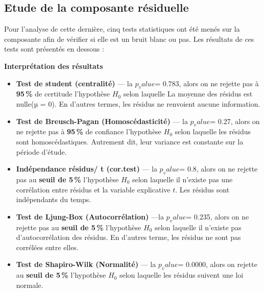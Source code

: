 \documentclass[
12pt,          %
a4paper,       %
oneside,       %
openright      %
]{report}
\begin{document}
 \subsection{Etude de la composante résiduelle}
 
 Pour l'analyse de cette dernière, cinq tests statistiques ont été menés sur la composante afin de vérifier si elle est un bruit blanc ou pas. 
 Les résultats de ces tests sont présentés en dessous : 
 
 \begin{table}[H]
 	\centering
 	
 	\caption{Résultats des tests statistiques sur la composante résiduelle}
 	\label{tab:resultats_tests_holt_winters}
 \end{table}
 
 \textbf{ Interprétation des résultats}
 

 
 \begin{itemize}
 	\item \textbf{Test de student (centralité)} --- la \textbf{$p_value$}= 0.783, alors on ne rejette pas  à \textbf{ 95\,\%} de certitude l'hypothèse $H_0$  selon laquelle La moyenne des résidus est nulle(µ = 0). En d'autres termes, les résidus ne renvoient aucune information.
 	
 	\item \textbf{Test de Breusch-Pagan (Homoscédasticité)} --- la \textbf{$p_value$}= 0.27, alors on ne rejette pas à \textbf{ 95\,\%} de confiance l'hypothèse $H_0$ selon laquelle les résidus sont homoscédastiques. Autrement dit, leur variance est constante sur la période d'étude.
 	
 	\item \textbf{Indépendance résidus/ t (cor.test)} --- la \textbf{$p_value$}= 0.8, alors on ne rejette pas  au \textbf{ seuil de 5\,\%} l'hypothèse $H_0$ selon laquelle il n'existe pas une corrélation entre résidus et la variable explicative $t$.
 	Les résidus sont indépendants du temps.
 	
 	\item \textbf{Test de Ljung-Box (Autocorrélation)} ---la \textbf{$p_value$}= 0.235, alors on ne rejette pas au \textbf{ seuil de 5\,\%} l'hypothèse $H_0$ selon laquelle il n'existe pas d'autocorrélation des résidus.
 	En d'autres terme, les résidus ne sont pas corrélées entre elles.
 	
 	\item \textbf{Test de Shapiro-Wilk (Normalité)} --- la \textbf{$p_value$}= 0.0000, alors on rejette au \textbf{ seuil de 5\,\%} l'hypothèse $H_0$ selon laquelle les résidus suivent une loi normale. 
 \end{itemize}
 
\end{document}
